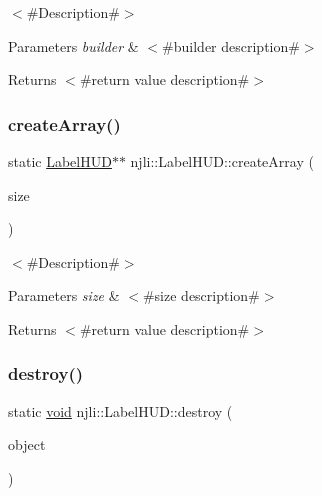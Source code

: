 $<$\#\+Description\#$>$


\begin{DoxyParams}{Parameters}
{\em builder} & $<$\#builder description\#$>$\\
\hline
\end{DoxyParams}
\begin{DoxyReturn}{Returns}
$<$\#return value description\#$>$ 
\end{DoxyReturn}
\mbox{\label{classnjli_1_1_label_h_u_d_a439b7a8a4120389b3499a6d8526c681a}} 
\subsubsection{\texorpdfstring{create\+Array()}{createArray()}}
{\footnotesize\ttfamily static \mbox{\hyperlink{classnjli_1_1_label_h_u_d}{Label\+H\+UD}}$\ast$$\ast$ njli\+::\+Label\+H\+U\+D\+::create\+Array (\begin{DoxyParamCaption}\item[{const \mbox{\hyperlink{_util_8h_a10e94b422ef0c20dcdec20d31a1f5049}{u32}}}]{size }\end{DoxyParamCaption})\hspace{0.3cm}{\ttfamily [static]}}

$<$\#\+Description\#$>$


\begin{DoxyParams}{Parameters}
{\em size} & $<$\#size description\#$>$\\
\hline
\end{DoxyParams}
\begin{DoxyReturn}{Returns}
$<$\#return value description\#$>$ 
\end{DoxyReturn}
\mbox{\label{classnjli_1_1_label_h_u_d_aa285d743d92bcf2dbb467dfeff1ea41a}} 
\subsubsection{\texorpdfstring{destroy()}{destroy()}}
{\footnotesize\ttfamily static \mbox{\hyperlink{_thread_8h_af1e856da2e658414cb2456cb6f7ebc66}{void}} njli\+::\+Label\+H\+U\+D\+::destroy (\begin{DoxyParamCaption}\item[{\mbox{\hyperlink{classnjli_1_1_label_h_u_d}{Label\+H\+UD}} $\ast$}]{object }\end{DoxyParamCaption})\hspace{0.3cm}{\ttfamily [static]}}

